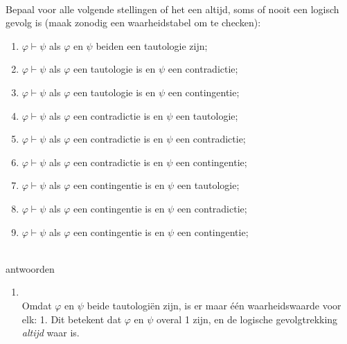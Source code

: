 \begin{answer}\mbox{}\\ %
Bepaal voor alle volgende stellingen of het een altijd, soms of nooit een logisch gevolg is (maak zonodig een waarheidstabel om te checken):
\begin{enumerate}[label=\textit{\alph*.}]
\item $\varphi\vdash\psi$ als $\varphi$ en $\psi$ beiden een tautologie zijn;
\item $\varphi\vdash\psi$ als $\varphi$ een tautologie is en $\psi$ een contradictie;
\item $\varphi\vdash\psi$ als $\varphi$ een tautologie is en $\psi$ een contingentie;
\item $\varphi\vdash\psi$ als $\varphi$ een contradictie is en $\psi$ een tautologie;
\item $\varphi\vdash\psi$ als $\varphi$ een contradictie is en $\psi$ een contradictie;
\item $\varphi\vdash\psi$ als $\varphi$ een contradictie is en $\psi$ een contingentie;
\item $\varphi\vdash\psi$ als $\varphi$ een contingentie is en $\psi$ een tautologie;
\item $\varphi\vdash\psi$ als $\varphi$ een contingentie is en $\psi$ een contradictie;
\item $\varphi\vdash\psi$ als $\varphi$ een contingentie is en $\psi$ een contingentie;
\end{enumerate}

  \mbox{}\\
antwoorden\\

\begin{enumerate}[label=\textit{\alph*.}]

\item{}\\
    Omdat $\varphi$ en $\psi$ beide tautologi\"{e}n zijn, is er maar \'{e}\'{e}n waarheidswaarde voor elk: 1. Dit betekent dat $\varphi$ en $\psi$ overal 1 zijn, en de logische gevolgtrekking \emph{altijd} waar is.


\end{enumerate}
\end{answer}
